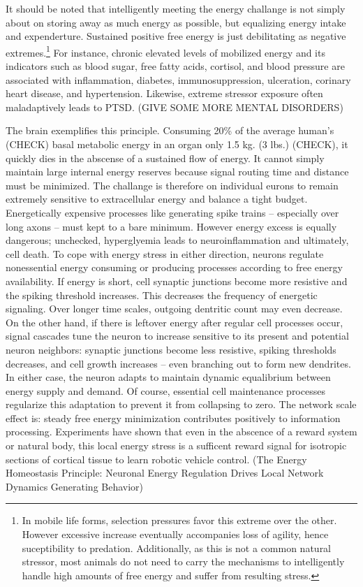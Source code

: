 It should be noted that intelligently meeting the energy challange is not simply about on storing away as much energy as possible, but equalizing energy intake and expenderture. Sustained positive free energy is just debilitating as negative extremes.\footnote{In mobile life forms, selection pressures favor this extreme over the other. However excessive increase eventually accompanies loss of agility, hence suceptibility to predation. Additionally, as this is not a common natural stressor, most animals do not need to carry the mechanisms to intelligently handle high amounts of free energy and suffer from resulting stress. } For instance, chronic elevated levels of mobilized energy and its indicators such as blood sugar, free fatty acids, cortisol, and blood pressure are associated with inflammation, diabetes, immunosuppression, ulceration, corinary heart disease, and hypertension. Likewise, extreme stressor exposure often maladaptively leads to PTSD. (GIVE SOME MORE MENTAL DISORDERS)

The brain exemplifies this principle. Consuming 20\% of the average human's (CHECK) basal metabolic energy in an organ only 1.5 kg. (3 lbs.) (CHECK), it quickly dies in the abscense of a sustained flow of energy. It cannot simply maintain large internal energy reserves because signal routing time and distance must be minimized. The challange is therefore on individual eurons to remain extremely sensitive to extracellular energy and balance a tight budget. Energetically expensive processes like generating spike trains -- especially over long axons -- must kept to a bare minimum. However energy excess is equally dangerous; unchecked, hyperglyemia leads to neuroinflammation and ultimately, cell death. To cope with energy stress in either direction, neurons regulate nonessential energy consuming or producing processes according to free energy availability. If energy is short, cell synaptic junctions become more resistive and the spiking threshold increases. This decreases the frequency of energetic signaling. Over longer time scales, outgoing dentritic count may even decrease. On the other hand, if there is leftover energy after regular cell processes occur, signal cascades tune the neuron to increase sensitive to its present and potential neuron neighbors: synaptic junctions become less resistive, spiking thresholds decreases, and cell growth increases -- even branching out to form new dendrites. In either case, the neuron adapts to maintain dynamic equalibrium between energy supply and demand. Of course, essential cell maintenance processes regularize this adaptation to prevent it from collapsing to zero. The network scale effect is: steady free energy minimization contributes positively to information processing. Experiments have shown that even in the abscence of a reward system or natural body, this local energy stress is a sufficent reward signal for isotropic sections of cortical tissue to learn robotic vehicle control. (The Energy Homeostasis Principle: Neuronal Energy Regulation Drives Local Network Dynamics Generating Behavior) 


